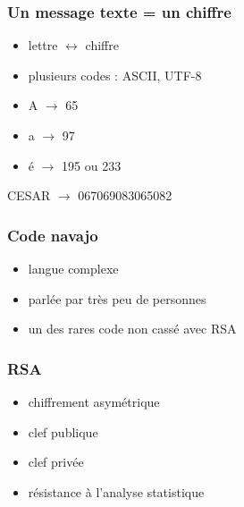 \documentclass[french]{beamer}
\begin{document}
\begin{frame}
  \frametitle{Un message texte = un chiffre}
  \begin{multicols}{2}
    \begin{block}{}
      \begin{itemize}
        \item lettre $\leftrightarrow$ chiffre
        \item plusieurs codes : ASCII, UTF-8
      \end{itemize}
    \end{block}
    \begin{block}{}
      \begin{itemize}
        \item A $\rightarrow$ 65
        \item a $\rightarrow$ 97
        \item é $\rightarrow$ 195 ou 233
      \end{itemize}
      CESAR $\rightarrow$ 067069083065082
    \end{block}
  \end{multicols}
\end{frame}

\begin{frame}
  \frametitle{Code navajo}
  \begin{itemize}
    \item langue complexe
    \item parlée par très peu de personnes
    \item un des rares code non cassé avec RSA
  \end{itemize}
\end{frame}

\begin{frame}
  \frametitle{RSA}
  \begin{block}{}
    \begin{itemize}
      \item chiffrement asymétrique
      \item clef publique
      \item clef privée
      \item résistance à l'analyse statistique
    \end{itemize}
  \end{block}
\end{frame}
\end{document}
